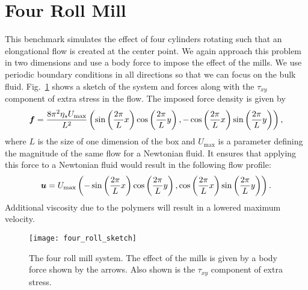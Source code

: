\section{Four Roll Mill}
This benchmark simulates the effect of four cylinders rotating such that an elongational flow is created at the center point. We again approach this problem in two dimensions and use a body force to impose the effect of the mills. We use periodic boundary conditions in all directions so that we can focus on the bulk fluid. Fig.~\ref{fig:four_roll_sketch} shows a sketch of the system and forces along with the $\tau_{xy}$ component of extra stress in the flow. The imposed force density is given by
\begin{equation}\label{eq:four_mill_force}
\bm{f} = \frac{8\pi^2  \eta_s U_{\mathrm{max}}}{L^2}\left(\sin\left(\frac{2\pi}{L} x\right)\cos\left(\frac{2\pi}{L} y\right), -\cos\left(\frac{2\pi}{L} x\right)\sin\left(\frac{2\pi}{L} y\right)\right),
\end{equation}
where $L$ is the size of one dimension of the box and $U_\mathrm{max}$ is a parameter defining the magnitude of the same flow for a Newtonian fluid. It ensures that applying this force to a Newtonian fluid would result in the following flow profile:
\begin{equation}
\bm{u} = U_\mathrm{max}\left(-
\sin\left(\frac{2\pi}{L} x\right)\cos\left(\frac{2\pi}{L} y\right), \cos\left(\frac{2\pi}{L} x\right)\sin\left(\frac{2\pi}{L} y\right)\right).
\end{equation}
Additional viscosity due to the polymers will result in a lowered maximum velocity.

\begin{figure}[t]
	\centering
	\texttt{[image: four\_roll\_sketch]}
	\caption{The four roll mill system. The effect of the mills is given by a body force shown by the arrows. Also shown is the $\tau_{xy}$ component of extra stress.}
	\label{fig:four_roll_sketch}
\end{figure}

